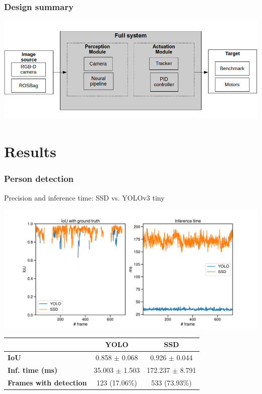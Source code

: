 \documentclass[11pt]{beamer}
\begin{document}
\begin{frame}
	\frametitle{Design summary}

	\includegraphics[width=\linewidth]{functional_architecture}
	
\end{frame}

\section{Results}
\begin{frame}
	\frametitle{Person detection}
	Precision and inference time: SSD vs. YOLOv3 tiny
	\begin{center}
		\includegraphics[width=0.8\linewidth]{test1}
	\end{center}
	
	\begin{table}[h]
		\tiny
		\begin{tabular}{|l|c|c|}
			\hline
			& \textbf{YOLO}             & \textbf{SSD}              \\ \hline
			\textbf{IoU}            & 0.858 $\pm$  0.068 & 0.926 $\pm$  0.044 \\ \hline
			\textbf{Inf. time (ms)} & 35.003 $\pm$ 1.503 & 172.237 $\pm$ 8.791 \\ \hline
			\textbf{Frames with detection} & 123 (17.06\%) & 533 (73.93\%) \\ \hline
		\end{tabular}
	\end{table}
	
\end{frame}
\end{document}
